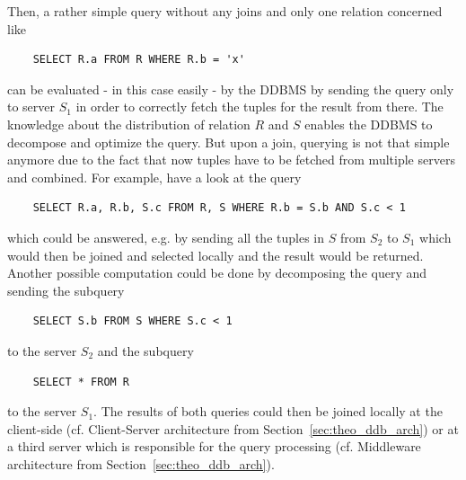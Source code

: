 \begin{exmp}
Then, a rather simple query without any joins and only one relation concerned like
\begin{verbatim}
    SELECT R.a FROM R WHERE R.b = 'x'
\end{verbatim}
can be evaluated - in this case easily - by the DDBMS by sending the query only to server $S_1$ in order to correctly fetch the tuples for the result from
there. The knowledge about the distribution of relation $R$ and $S$ enables the DDBMS to decompose and optimize the query. But upon a join, querying is not
that simple anymore due to the fact that now tuples have to be fetched from multiple servers and combined. For example, have a look at the query
\begin{verbatim}
    SELECT R.a, R.b, S.c FROM R, S WHERE R.b = S.b AND S.c < 1
\end{verbatim}
which could be answered, e.g. by sending all the tuples in $S$ from $S_2$ to $S_1$ which would then be joined and selected locally and the result would be
returned. Another possible computation could be done by decomposing the query and sending the subquery
\begin{verbatim}
    SELECT S.b FROM S WHERE S.c < 1
\end{verbatim}
to the server $S_2$ and the subquery
\begin{verbatim}
    SELECT * FROM R
\end{verbatim}
to the server $S_1$. 
The results of both queries could then be joined locally at the client-side (cf. Client-Server architecture from Section~\ref{sec:theo_ddb_arch}) or at a 
third server which is responsible for the query processing (cf. Middleware architecture from Section~\ref{sec:theo_ddb_arch}).



\end{exmp}